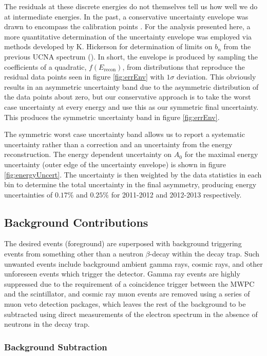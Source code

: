 The residuals at these discrete energies do not
themselves tell us how well we do at intermediate energies. In the past, a conservative
uncertainty envelope was drawn to encompass the calibration points
\cite{mendenhall2013,mpmThesis}. For the analysis
presented here, a more quantitative determination of the uncertainty envelope was employed
via methods developed by K. Hickerson for determination of limits on $b_n$ from the previous
UCNA spectrum (\cite{hickerson2017}). In short, the envelope is produced by sampling
the coefficients of a quadratic, $f(E_{\mathrm{recon}})$, from distributions that reproduce
the residual data points seen in figure \ref{fig:errEnv} with $1\sigma$ deviation.
This
obviously results in an asymmetric uncertainty band due to the asymmetric distribution
of the data points about zero, but our conservative approach is
to take the worst case uncertainty at every energy and use this as our
symmetric final uncertainty.
This produces the symmetric uncertainty band in figure \ref{fig:errEnv}.

The symmetric worst case uncertainty band allows us to report a systematic uncertainty
rather than a correction and an uncertainty from the energy reconstruction. The energy
dependent uncertainty on $A_0$ for the maximal energy uncertainty (outer edge of the
uncertainty envelope) is shown in figure \ref{fig:energyUncert}.
The uncertainty is then weighted by the data statistics in each bin to determine the
total uncertainty in the final asymmetry, producing energy uncertainties of $0.17\%$ and
$0.25\%$ for 2011-2012 and 2012-2013 respectively.

\subsection{Background Contributions}

The desired events (foreground) are superposed with background
triggering events from something other
than a neutron $\beta$-decay within the decay trap. Such unwanted events include
background ambient
gamma rays, cosmic rays,
and other unforeseen events which trigger the detector.
Gamma ray events are highly suppressed due to the
requirement of a coincidence trigger between the MWPC and the scintillator,
and cosmic ray muon events are removed using a series of muon veto
detection packages, which leaves the rest of the background to be subtracted using direct
measurements of the electron spectrum in the absence of neutrons in the decay trap.

\subsubsection{Background Subtraction}

